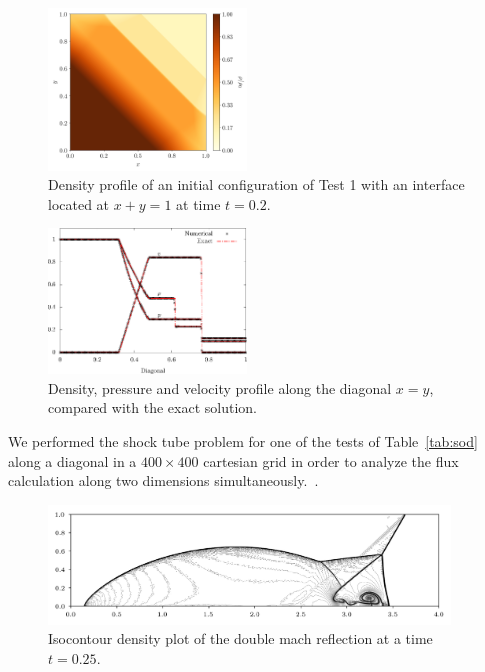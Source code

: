 \begin{figure}
    \centering
    \includegraphics[width=0.47\textwidth]{Figures/shock-d.png}
    \caption{Density profile of an initial configuration of Test 1 with an interface located at $x + y = 1$ at time $t = 0.2$.}
    \label{fig:diag}
\end{figure}
\begin{figure}
    \centering
    \includegraphics[width=0.47\textwidth]{Figures/diag.eps}
    \caption{Density, pressure and velocity profile along the diagonal $x=y$, compared with the exact solution.}
    \label{fig:diag-1d}
\end{figure}

We performed the shock tube problem for one of the tests of Table~\ref{tab:sod} along a diagonal in a $400 \times 400$ cartesian grid in order to analyze the flux calculation along two dimensions simultaneously.~\citep[see][were a similar study was implemented for the relativistic case]{lora2015}.

\begin{figure}
    \centering
    \includegraphics[width=0.95\textwidth]{Figures/reflection.png}
    \caption{Isocontour density plot of the double mach reflection at a time $t=0.25$.}
    \label{fig:reflection}
\end{figure}

